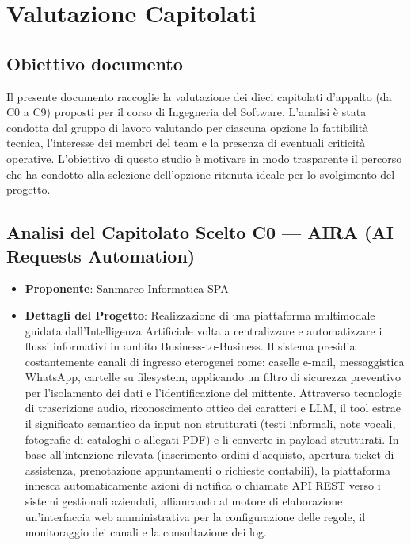 
\section{Valutazione Capitolati}

\subsection{Obiettivo documento}
Il presente documento raccoglie la valutazione dei dieci capitolati d'appalto (da C0 a C9) proposti per il corso di Ingegneria del Software. L'analisi è stata condotta dal gruppo di lavoro valutando per ciascuna opzione la fattibilità tecnica, l'interesse dei membri del team e la presenza di eventuali criticità operative.
L'obiettivo di questo studio è motivare in modo trasparente il percorso che ha condotto alla selezione dell'opzione ritenuta ideale per lo svolgimento del progetto.

\subsection{Analisi del Capitolato Scelto C0 — AIRA (AI Requests Automation)}
\begin{itemize}
    \item \textbf{Proponente}: Sanmarco Informatica SPA
    \item \textbf{Dettagli del Progetto}: Realizzazione di una piattaforma multimodale guidata dall'Intelligenza Artificiale volta a centralizzare e automatizzare i flussi informativi in ambito Business-to-Business. Il sistema presidia costantemente canali di ingresso eterogenei come: caselle e-mail, messaggistica WhatsApp, cartelle su filesystem, applicando un filtro di sicurezza preventivo per l'isolamento dei dati e l'identificazione del mittente. Attraverso tecnologie di trascrizione audio, riconoscimento ottico dei caratteri e LLM, il tool estrae il significato semantico da input non strutturati (testi informali, note vocali, fotografie di cataloghi o allegati PDF) e li converte in payload strutturati. In base all'intenzione rilevata (inserimento ordini d'acquisto, apertura ticket di assistenza, prenotazione appuntamenti o richieste contabili), la piattaforma innesca automaticamente azioni di notifica o chiamate API REST verso i sistemi gestionali aziendali, affiancando al motore di elaborazione un'interfaccia web amministrativa per la configurazione delle regole, il monitoraggio dei canali e la consultazione dei log.
\end{itemize}

